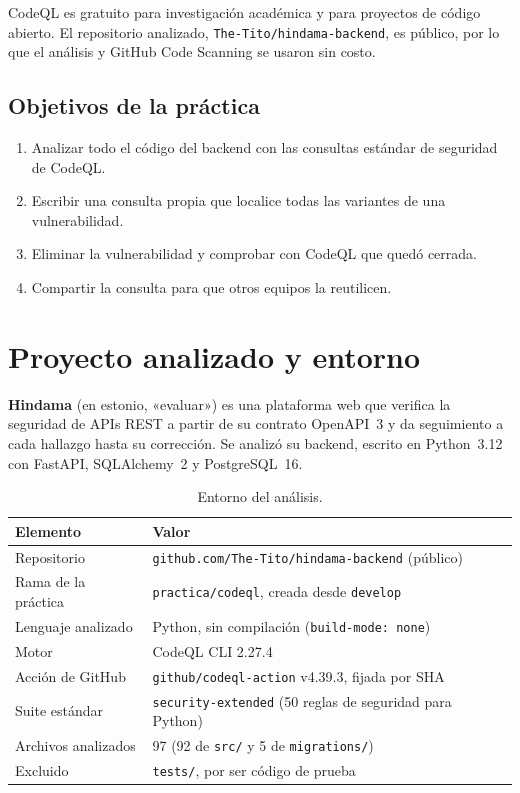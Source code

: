 \documentclass[11pt,a4paper]{article}
\newcommand{\cod}[1]{\texttt{#1}}
\begin{document}
CodeQL es gratuito para investigación académica y para proyectos de código abierto. El repositorio analizado, \cod{The-Tito/hindama-backend}, es público, por lo que el análisis y GitHub Code Scanning se usaron sin costo.

\subsection*{Objetivos de la práctica}
\begin{enumerate}
  \item Analizar todo el código del backend con las consultas estándar de seguridad de CodeQL.
  \item Escribir una consulta propia que localice todas las variantes de una vulnerabilidad.
  \item Eliminar la vulnerabilidad y comprobar con CodeQL que quedó cerrada.
  \item Compartir la consulta para que otros equipos la reutilicen.
\end{enumerate}

\section{Proyecto analizado y entorno}

\textbf{Hindama} (en estonio, «evaluar») es una plataforma web que verifica la seguridad de APIs REST a partir de su contrato OpenAPI~3 y da seguimiento a cada hallazgo hasta su corrección. Se analizó su backend, escrito en Python~3.12 con FastAPI, SQLAlchemy~2 y PostgreSQL~16.

\begin{table}[H]\centering
\caption{Entorno del análisis.}
\begin{tabularx}{\linewidth}{@{}p{4.2cm}L@{}}
\toprule
\textbf{Elemento} & \textbf{Valor} \\ \midrule
Repositorio & \cod{github.com/The-Tito/hindama-backend} (público) \\
Rama de la práctica & \cod{practica/codeql}, creada desde \cod{develop} \\
Lenguaje analizado & Python, sin compilación (\cod{build-mode: none}) \\
Motor & CodeQL CLI 2.27.4 \\
Acción de GitHub & \cod{github/codeql-action} v4.39.3, fijada por SHA \\
Suite estándar & \cod{security-extended} (50 reglas de seguridad para Python) \\
Archivos analizados & 97 (92 de \cod{src/} y 5 de \cod{migrations/}) \\
Excluido & \cod{tests/}, por ser código de prueba \\ \bottomrule
\end{tabularx}
\end{table}
\end{document}
